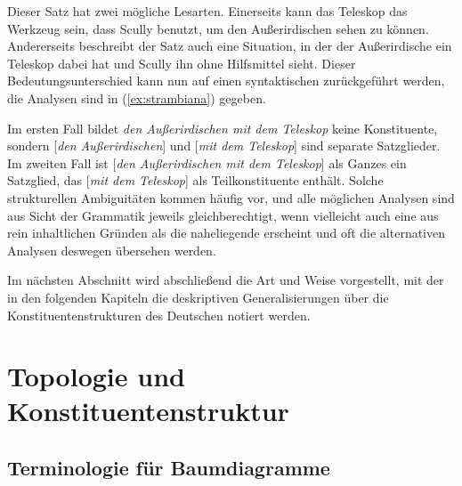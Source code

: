 Dieser Satz hat zwei mögliche Lesarten.
Einerseits kann das Teleskop das Werkzeug sein, dass Scully benutzt, um den Außerirdischen sehen zu können.
Andererseits beschreibt der Satz auch eine Situation, in der der Außerirdische ein Teleskop dabei hat und Scully ihn ohne Hilfsmittel sieht.
Dieser Bedeutungsunterschied kann nun auf einen syntaktischen zurückgeführt werden, die Analysen sind in (\ref{ex:strambiana}) gegeben.

\begin{exe}
  \ex\label{ex:strambiana}
  \begin{xlist}
  \end{xlist}
\end{exe}

Im ersten Fall bildet \textit{den Außerirdischen mit dem Teleskop} keine Konstituente, sondern [\textit{den Außerirdischen}] und [\textit{mit dem Teleskop}] sind separate Satzglieder.
Im zweiten Fall ist [\textit{den Außerirdischen mit dem Teleskop}] als Ganzes ein Satzglied, das [\textit{mit dem Teleskop}] als Teilkonstituente enthält.
Solche strukturellen Ambiguitäten kommen häufig vor, und alle möglichen Analysen sind aus Sicht der Grammatik jeweils gleichberechtigt, wenn vielleicht auch eine aus rein inhaltlichen Gründen als die naheliegende erscheint und oft die alternativen Analysen deswegen übersehen werden.


Im nächsten Abschnitt wird abschließend die Art und Weise vorgestellt, mit der in den folgenden Kapiteln die deskriptiven Generalisierungen über die Konstituentenstrukturen des Deutschen notiert werden.

\section{Topologie und Konstituentenstruktur}

\label{sec:topokons}

\subsection{Terminologie für Baumdiagramme}

